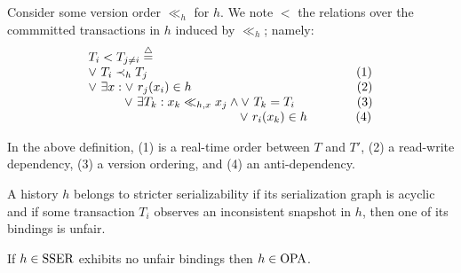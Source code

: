 \begin{definition}
  Consider some version order $\ll_h$ for $h$.
  We note $<$ the relations over the commmitted transactions in $h$ induced by $\ll_h$; namely:
  \begin{displaymath}
    \begin{array}{l}
      T_i < T_{j \neq i}  \equaldef \\
      \lor~ T_i \hb_h T_j {\hspace{16.8em}\text{(1)}} \\
      \lor~ \exists x : \lor~ r_j(x_i) \in h {\hspace{13.3em}\text{(2)}} \\
      \hspace{2.9em}\lor~ \exists T_k : x_k \ll_{h,x} x_j \land \lor~T_k = T_i {\hspace{5em}\text{(3)}} \\
      \hspace{12.2em} \lor~ r_i(x_k) \in h {\hspace{3.9em}\text{(4)}}
    \end{array}
  \end{displaymath}
\end{definition}

In the above definition, (1) is a real-time order between $T$ and $T'$, (2) a read-write dependency, (3) a version ordering, and (4) an anti-dependency.

\begin{definition}
  A history $h$ belongs to stricter serializability if its serialization graph is acyclic and if some transaction $T_i$ observes an inconsistent snapshot in $h$, then one of its bindings is unfair.
\end{definition}

\begin{corollary}
  If $h \in \SSER$ exhibits no unfair bindings then $h \in \OPA$.
\end{corollary}
